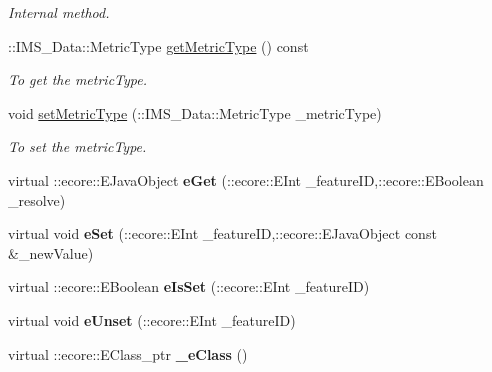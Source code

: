 \begin{DoxyCompactItemize}
\begin{DoxyCompactList}\small\item\em Internal method. \item\end{DoxyCompactList}\item 
::IMS\_\-Data::MetricType \hyperlink{classIMS__Data_1_1CurMetricOp_a231b45d28dd01b6125f9ec0551d427a6}{getMetricType} () const 
\begin{DoxyCompactList}\small\item\em To get the metricType. \item\end{DoxyCompactList}\item 
void \hyperlink{classIMS__Data_1_1CurMetricOp_ada4a905ee9a7390264fedee3c7494c41}{setMetricType} (::IMS\_\-Data::MetricType \_\-metricType)
\begin{DoxyCompactList}\small\item\em To set the metricType. \item\end{DoxyCompactList}\item 
\hypertarget{classIMS__Data_1_1CurMetricOp_a99fb99289eba43ac1267ce1eb19c27d1}{
virtual ::ecore::EJavaObject {\bfseries eGet} (::ecore::EInt \_\-featureID,::ecore::EBoolean \_\-resolve)}
\label{classIMS__Data_1_1CurMetricOp_a99fb99289eba43ac1267ce1eb19c27d1}

\item 
\hypertarget{classIMS__Data_1_1CurMetricOp_a0a3c9176a14f66b77b31059d8f5a38ea}{
virtual void {\bfseries eSet} (::ecore::EInt \_\-featureID,::ecore::EJavaObject const \&\_\-newValue)}
\label{classIMS__Data_1_1CurMetricOp_a0a3c9176a14f66b77b31059d8f5a38ea}

\item 
\hypertarget{classIMS__Data_1_1CurMetricOp_aafbc1c3a760123a56d2aa3e7ec2dcfd6}{
virtual ::ecore::EBoolean {\bfseries eIsSet} (::ecore::EInt \_\-featureID)}
\label{classIMS__Data_1_1CurMetricOp_aafbc1c3a760123a56d2aa3e7ec2dcfd6}

\item 
\hypertarget{classIMS__Data_1_1CurMetricOp_ae61d36678ca91941d3b38f95999c0a27}{
virtual void {\bfseries eUnset} (::ecore::EInt \_\-featureID)}
\label{classIMS__Data_1_1CurMetricOp_ae61d36678ca91941d3b38f95999c0a27}

\item 
\hypertarget{classIMS__Data_1_1CurMetricOp_a9f7a8f06fc3e81cb731b9db195397e5c}{
virtual ::ecore::EClass\_\-ptr {\bfseries \_\-eClass} ()}
\label{classIMS__Data_1_1CurMetricOp_a9f7a8f06fc3e81cb731b9db195397e5c}

\end{DoxyCompactItemize}
